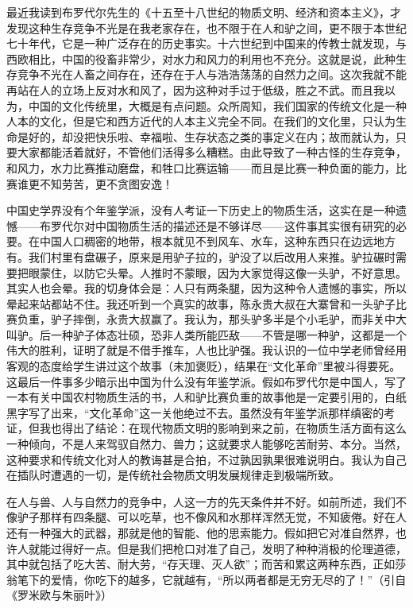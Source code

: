 最近我读到布罗代尔先生的《十五至十八世纪的物质文明、经济和资本主义》，才发现这种生存竞争不光是在我老家存在，也不限于在人和驴之间，更不限于本世纪七十年代，它是一种广泛存在的历史事实。十六世纪到中国来的传教士就发现，与西欧相比，中国的役畜非常少，对水力和风力的利用也不充分。这就是说，此种生存竞争不光在人畜之间存在，还存在于人与浩浩荡荡的自然力之间。这次我就不能再站在人的立场上反对水和风了，因为这种对手过于低级，胜之不武。而且我以为，中国的文化传统里，大概是有点问题。众所周知，我们国家的传统文化是一种人本的文化，但是它和西方近代的人本主义完全不同。在我们的文化里，只认为生命是好的，却没把快乐啦、幸福啦、生存状态之类的事定义在内；故而就认为，只要大家都能活着就好，不管他们活得多么糟糕。由此导致了一种古怪的生存竞争，和风力，水力比赛推动磨盘，和牲口比赛运输——而且是比赛一种负面的能力，比赛谁更不知劳苦，更不贪图安逸！ 

中国史学界没有个年鉴学派，没有人考证一下历史上的物质生活，这实在是一种遗憾——布罗代尔对中国物质生活的描述还是不够详尽——这件事其实很有研究的必要。在中国人口稠密的地带，根本就见不到风车、水车，这种东西只在边远地方有。我们村里有盘碾子，原来是用驴子拉的，驴没了以后改用人来推。驴拉碾时需要把眼蒙住，以防它头晕。人推时不蒙眼，因为大家觉得这像一头驴，不好意思。其实人也会晕。我的切身体会是：人只有两条腿，因为这种令人遗憾的事实，所以晕起来站都站不住。我还听到一个真实的故事，陈永贵大叔在大寨曾和一头驴子比赛负重，驴子摔倒，永贵大叔赢了。我认为，那头驴多半是个小毛驴，而非关中大叫驴。后一种驴子体态壮硕，恐非人类所能匹敌——不管是哪一种驴，这都是一个伟大的胜利，证明了就是不借手推车，人也比驴强。我认识的一位中学老师曾经用客观的态度给学生讲过这个故事（未加褒贬），结果在“文化革命”里被斗得要死。这最后一件事多少暗示出中国为什么没有年鉴学派。假如布罗代尔是中国人，写了一本有关中国农村物质生活的书，人和驴比赛负重的故事他是一定要引用的，白纸黑字写了出来，“文化革命”这一关他绝过不去。虽然没有年鉴学派那样缜密的考证，但我也得出了结论：在现代物质文明的影响到来之前，在物质生活方面有这么一种倾向，不是人来驾驭自然力、兽力；这就要求人能够吃苦耐劳、本分。当然，这种要求和传统文化对人的教诲甚是合拍，不过孰因孰果很难说明白。我认为自己在插队时遭遇的一切，是传统社会物质文明发展规律走到极端所致。 

在人与兽、人与自然力的竞争中，人这一方的先天条件并不好。如前所述，我们不像驴子那样有四条腿、可以吃草，也不像风和水那样浑然无觉，不知疲倦。好在人还有一种强大的武器，那就是他的智能、他的思索能力。假如把它对准自然界，也许人就能过得好一点。但是我们把枪口对准了自己，发明了种种消极的伦理道德，其中就包括了吃大苦、耐大劳，“存天理、灭人欲”；而苦和累这两种东西，正如莎翁笔下的爱情，你吃下的越多，它就越有，“所以两者都是无穷无尽的了！”（引自《罗米欧与朱丽叶》） 

